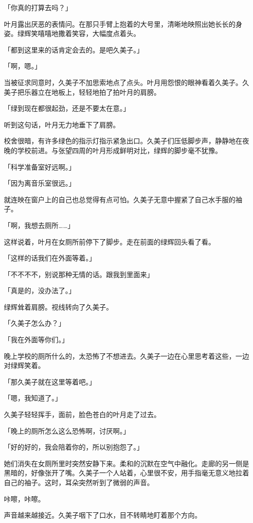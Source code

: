 \documentclass[UTF8]{ctexart}
\begin{document}
    「你真的打算去吗？」

    叶月露出厌恶的表情问。在那只手臂上抱着的大号里，清晰地映照出她长长的身姿。绿辉笑嘻嘻地撒着笑容，大幅度点着头。

    「都到这里来的话肯定会去的。是吧久美子。」

    「啊，嗯。」

    当被征求同意时，久美子不加思索地点了点头。叶月用怨恨的眼神看着久美子。久美子把乐器立在地板上，轻轻地拍了拍叶月的肩膀。

    「绿到现在都很起劲，还是不要太在意。」

    听到这句话，叶月无力地垂下了肩膀。

    校舍很暗，有许多绿色的指示灯指示紧急出口。久美子们压低脚步声，静静地在夜晚的学校前进。与张望四周的叶月形成鲜明对比，绿辉的脚步毫不犹豫。

    「科学准备室好远啊。」

    「因为离音乐室很远。」

    就连映在窗户上的自己也总觉得有点可怕。久美子无意中握紧了自己水手服的袖子。

    「啊，我想去厕所……」

    这样说着，叶月在女厕所前停下了脚步。走在前面的绿辉回头看了看。

    「这样的话我们在外面等着。」

    「不不不不，别说那种无情的话。跟我到里面来」

    「真是的，没办法了。」

    绿辉耸着肩膀。视线转向了久美子。

    「久美子怎么办？」

    「我在外面等你们。」

    晚上学校的厕所什么的，太恐怖了不想进去。久美子一边在心里思考着这些，一边对绿辉笑着。

    「那久美子就在这里等着吧。」

    「嗯，我知道了。」

    久美子轻轻挥手，面前，脸色苍白的叶月走了过去。

    「晚上的厕所怎么这么恐怖啊，讨厌啊。」

    「好的好的，我会陪着你的，所以别抱怨了。」

    她们消失在女厕所里时突然安静下来。柔和的沉默在空气中融化。走廊的另一侧是黑暗的，好像张开了嘴。久美子一个人站着，心里很不安，用手指毫无意义地拉着自己的袖子。这时，耳朵突然听到了微弱的声音。

    咔嚓，咔嚓。

    声音越来越接近。久美子咽下了口水，目不转睛地盯着那个方向。
\end{document}
